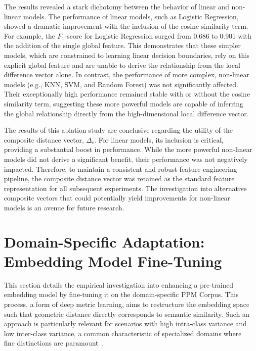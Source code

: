 The results revealed a stark dichotomy between the behavior of linear and non-linear models. The performance of linear models, such as Logistic Regression, showed a dramatic improvement with the inclusion of the cosine similarity term. For example, the \(F_1\)-score for Logistic Regression surged from 0.686 to 0.901 with the addition of the single global feature. This demonstrates that these simpler models, which are constrained to learning linear decision boundaries, rely on this explicit global feature and are unable to derive the relationship from the local difference vector alone. In contrast, the performance of more complex, non-linear models (e.g., KNN, SVM, and Random Forest) was not significantly affected. Their exceptionally high performance remained stable with or without the cosine similarity term, suggesting these more powerful models are capable of inferring the global relationship directly from the high-dimensional local difference vector.

The results of this ablation study are conclusive regarding the utility of the composite distance vector, \(\Delta_c\). For linear models, its inclusion is critical, providing a substantial boost in performance. While the more powerful non-linear models did not derive a significant benefit, their performance was not negatively impacted. Therefore, to maintain a consistent and robust feature engineering pipeline, the composite distance vector was retained as the standard feature representation for all subsequent experiments. The investigation into alternative composite vectors that could potentially yield improvements for non-linear models is an avenue for future research.

\section{Domain-Specific Adaptation: Embedding Model Fine-Tuning}\label{ch:4.4}
This section details the empirical investigation into enhancing a pre-trained embedding model by fine-tuning it on the domain-specific PPM Corpus. This process, a form of deep metric learning, aims to restructure the embedding space such that geometric distance directly corresponds to semantic similarity. Such an approach is particularly relevant for scenarios with high intra-class variance and low inter-class variance, a common characteristic of specialized domains where fine distinctions are paramount~\cite{mohan2023deepmetriclearningcomputer}.

